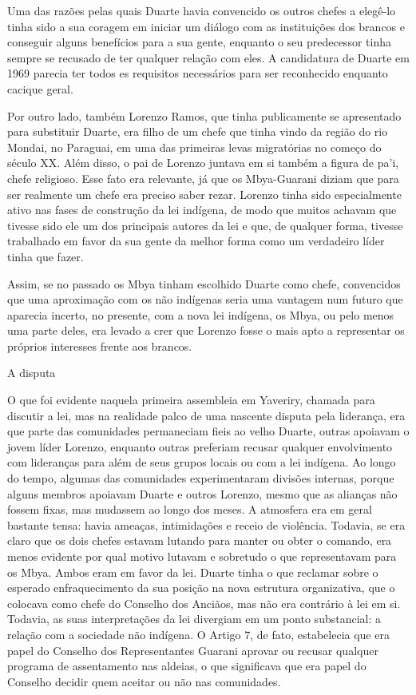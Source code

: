\documentclass{article}
\begin{document}
Uma das raz\~oes pelas quais Duarte havia convencido os outros chefes a
eleg\^e-lo tinha sido a sua coragem em iniciar um di\'alogo com as
institui\c{c}\~oes dos brancos e conseguir alguns benef\'icios para a
sua gente, enquanto o seu predecessor tinha sempre se recusado de ter
qualquer rela\c{c}\~ao com eles. A candidatura de Duarte em 1969
parecia ter todos es requisitos necess\'arios para ser reconhecido
enquanto cacique geral.

Por outro lado, tamb\'em Lorenzo Ramos, que tinha publicamente se
apresentado para substituir Duarte, era filho de um chefe que tinha
vindo da regi\~ao do rio Mondai, no Paraguai, em uma das primeiras
levas migrat\'orias no come\c{c}o do s\'eculo XX. Al\'em disso, o pai
de Lorenzo juntava em si tamb\'em a figura de pa{\textquoteright}i,
chefe religioso.  Esse fato era relevante, j\'a que os Mbya-Guarani
diziam que para ser realmente um chefe era preciso saber rezar. Lorenzo
tinha sido especialmente ativo nas fases de constru\c{c}\~ao da lei
ind\'igena, de modo que muitos achavam que tivesse sido ele um dos
principais autores da lei e que, de qualquer forma, tivesse trabalhado
em favor da sua gente da melhor forma como um verdadeiro l\'ider tinha
que fazer.

Assim, se no passado os Mbya tinham escolhido Duarte como chefe,
convencidos que uma aproxima\c{c}\~ao com os n\~ao ind\'igenas seria
uma vantagem num futuro que aparecia incerto, no presente, com a nova
lei ind\'igena, os Mbya, ou pelo menos uma parte deles, era levado a
crer que Lorenzo fosse o mais apto a representar os pr\'oprios
interesses frente aos brancos.

A disputa

O que foi evidente naquela primeira assembleia em Yaveriry, chamada para
discutir a lei, mas na realidade palco de uma nascente disputa pela
lideran\c{c}a, era que parte das comunidades permaneciam fieis ao velho
Duarte, outras apoiavam o jovem l\'ider Lorenzo, enquanto outras
preferiam recusar qualquer envolvimento com lideran\c{c}as para al\'em
de seus grupos locais ou com a lei ind\'igena. Ao longo do tempo,
algumas das comunidades experimentaram divis\~oes internas, porque
alguns membros apoiavam Duarte e outros Lorenzo, mesmo que as
alian\c{c}as n\~ao fossem fixas, mas mudassem ao longo dos meses. A
atmosfera era em geral bastante tensa: havia amea\c{c}as,
intimida\c{c}\~oes e receio de viol\^encia. Todavia, se era claro que
os dois chefes estavam lutando para manter ou obter o comando, era
menos evidente por qual motivo lutavam e sobretudo o que representavam
para os Mbya. Ambos eram em favor da lei. Duarte tinha o que reclamar
sobre o esperado enfraquecimento da sua posi\c{c}\~ao na nova estrutura
organizativa, que o colocava como chefe do Conselho dos Anci\~aos, mas
n\~ao era contr\'ario \`a lei em si. Todavia, as suas
interpreta\c{c}\~oes da lei divergiam em um ponto substancial: a
rela\c{c}\~ao com a sociedade n\~ao ind\'igena. O Artigo 7, de fato,
estabelecia que era papel do Conselho dos Representantes Guarani
aprovar ou recusar qualquer programa de assentamento nas aldeias, o que
significava que era papel do Conselho decidir quem aceitar ou n\~ao nas
comunidades.
\end{document}
